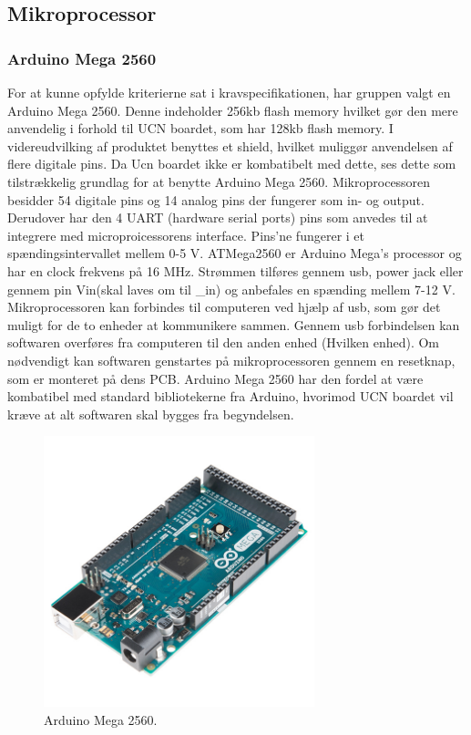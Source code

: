 \subsection{Mikroprocessor}
\subsubsection{Arduino Mega 2560}
For at kunne opfylde kriterierne sat i kravspecifikationen, har gruppen valgt en Arduino Mega 2560. Denne indeholder 256kb flash memory hvilket gør den mere anvendelig i forhold til UCN boardet, som har 128kb flash memory. \newline I videreudvilking af produktet benyttes et shield, hvilket muliggør anvendelsen af flere digitale pins. Da Ucn boardet ikke er kombatibelt med dette, ses dette som tilstrækkelig grundlag for at benytte Arduino Mega 2560. 
\newline
Mikroprocessoren besidder 54 digitale pins og 14 analog pins der fungerer som in- og output. Derudover har den 4 UART (hardware serial ports) pins som anvedes til at integrere med microproicessorens interface. Pins'ne fungerer i et spændingsintervallet mellem 0-5 V. 
\newline
ATMega2560 er Arduino Mega's processor og har en clock frekvens på 16 MHz. Strømmen tilføres gennem usb, power jack eller gennem pin Vin\fxnote(skal laves om til _in) og anbefales en spænding mellem 7-12 V. 
\newline
Mikroprocessoren kan forbindes til computeren ved hjælp af usb, som gør det muligt for de to enheder at kommunikere sammen. Gennem usb forbindelsen kan softwaren overføres fra computeren til den anden enhed \fxnote(Hvilken enhed). Om nødvendigt kan softwaren genstartes på mikroprocessoren gennem en resetknap, som er monteret på dens PCB.\newline 
Arduino Mega 2560 har den fordel at være kombatibel med standard bibliotekerne fra Arduino, hvorimod UCN boardet vil kræve at alt softwaren skal bygges fra begyndelsen.

\begin{figure}[h!]
  \centering
  \includegraphics[width=0.7\textwidth]{figures/arduinoMega.jpg}
  \caption{Arduino Mega 2560.}
  \label{tempgraf_eksempel1}
\end{figure} 


\newpage



